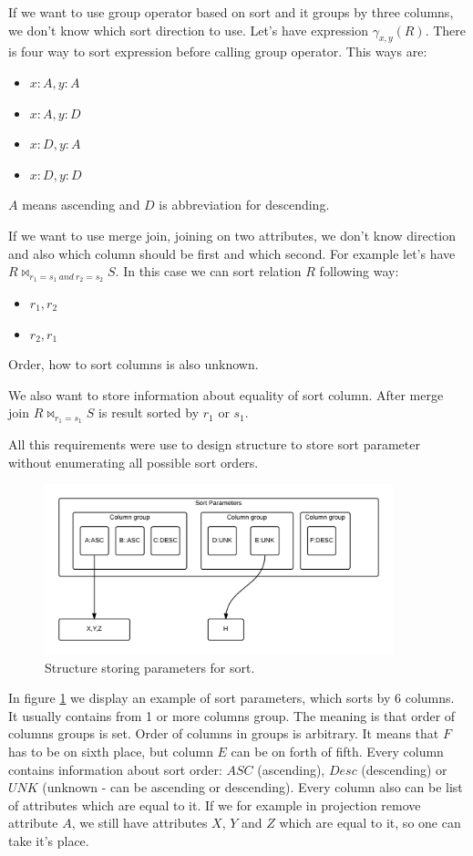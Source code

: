 If we want to use group operator based on sort and it groups by three columns, we don't know which sort direction to use. Let's have expression $\gamma_{x,y}(R)$. There is four way to sort expression before calling group operator. This ways are:
\begin{itemize}
\item $x:A,y:A$
\item $x:A,y:D$
\item $x:D,y:A$
\item $x:D,y:D$
\end{itemize}
$A$ means ascending and $D$ is abbreviation for descending.

If we want to use merge join, joining on two attributes, we don't know direction and also which column should be first and which second. For example let's have $R\Join_{r_1=s_1~and~r_2=s_2} S$. In this case we can sort relation $R$ following way:
\begin{itemize}
\item $r_1,r_2$
\item $r_2,r_1$
\end{itemize}
Order, how to sort columns is also unknown.

We also want to store information about equality of sort column. After merge join $R\Join_{r_1=s_1} S$ is result sorted by $r_1$ or $s_1$.

All this requirements were use to design structure to store sort parameter without enumerating all possible sort orders.

\begin{figure}[h!]
  \centering
    \includegraphics[width=0.9\textwidth]{sortparameters}

      \caption{Structure storing parameters for sort.}
          \label{fig:sortparameters}
\end{figure}

In figure \ref{fig:sortparameters} we display an example of sort parameters, which sorts by 6 columns. It usually contains from 1 or more columns group. The meaning is that order of columns groups is set. Order of columns in groups is arbitrary. It means that $F$ has to be on sixth place, but column $E$ can be on forth of fifth. Every column contains information about sort order: $ASC$ (ascending), $Desc$ (descending) or $UNK$ (unknown - can be ascending or descending). Every column also can be list of attributes which are equal to it. If we for example in projection remove attribute $A$, we still have attributes $X$, $Y$ and $Z$ which are equal to it, so one can take it's place.

